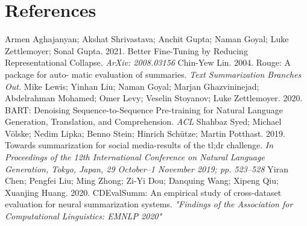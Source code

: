 \documentclass[11pt,a4paper, twocolumn]{article}
\begin{document}
\section*{References}
 \noindent Armen Aghajanyan; Akshat Shrivastava; Anchit Gupta; Naman Goyal; Luke Zettlemoyer; Sonal Gupta. 2021. Better Fine-Tuning by Reducing Representational Collapse. \emph{ArXiv: 2008.03156}
 \bigbreak
\noindent Chin-Yew Lin. 2004. Rouge: A package for auto-
matic evaluation of summaries. \emph{Text Summarization
Branches Out.}
\bigbreak
\noindent Mike Lewis; Yinhan Liu; Naman Goyal; Marjan Ghazvininejad; Abdelrahman Mohamed; Omer Levy; Veselin Stoyanov; Luke Zettlemoyer. 2020. BART: Denoising Sequence-to-Sequence Pre-training for Natural Language Generation, Translation, and Comprehension. \emph{ACL}
\bigbreak
\noindent Shahbaz Syed; Michael Völske; Nedim Lipka; Benno Stein; Hinrich Schütze; Martin Potthast. 2019. Towards summarization for social media-results of the tl;dr
challenge. \emph{In Proceedings of the 12th International Conference on Natural Language Generation, Tokyo, Japan, 29 October–1
November 2019; pp. 523–528}
\bigbreak
\noindent Yiran Chen; Pengfei Liu; Ming Zhong; Zi-Yi Dou; Danquing Wang; Xipeng Qiu; Xuanjing Huang. 2020. CDEvalSumm: An empirical study of cross-dataset evaluation
for neural summarization systems. \emph{"Findings of the Association for Computational Linguistics: EMNLP 2020"}
\end{document}
